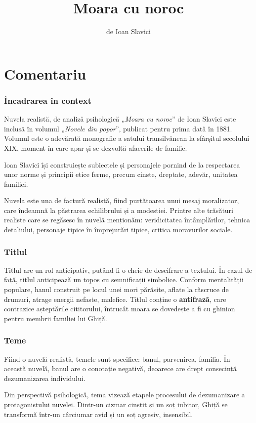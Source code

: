 \documentclass{article}
\title{Moara cu noroc}
\author{de Ioan Slavici}
\date{}
\newcommand{\qu}[1]{„\emph{#1}”}
\begin{document}
\maketitle

\part*{Comentariu}
\section{Încadrarea în context}
Nuvela realistă, de analiză psihologică \qu{Moara cu noroc} de Ioan Slavici este inclusă în volumul \qu{Novele din popor}, publicat pentru prima dată în 1881. Volumul este o adevărată monografie a satului transilvănean la sfârșitul secolului XIX, moment în care apar și se dezvoltă afacerile de familie.

Ioan Slavici își construiește subiectele și personajele pornind de la respectarea unor norme și principii etice ferme, precum cinste, dreptate, adevăr, unitatea familiei.

Nuvela este una de factură realistă, fiind purtătoarea unui mesaj moralizator, care îndeamnă la păstrarea echilibrului și a modestiei. Printre alte trăsături realiste care se regăsesc în nuvelă menționăm: veridicitatea întâmplărilor, tehnica detaliului, personaje tipice în împrejurări tipice, critica moravurilor sociale.
\section{Titlul}
Titlul are un rol anticipativ, putând fi o cheie de descifrare a textului. În cazul de față, titlul anticipează un topos cu semnificații simbolice. Conform mentalității populare, hanul construit pe locul unei mori părăsite, aflate la răscruce de drumuri, atrage energii nefaste, malefice. Titlul conține o \textbf{antifrază}, care contrazice așteptările cititorului, întrucât moara se dovedește a fi cu ghinion pentru membrii familiei lui Ghiță.

\section{Teme}
Fiind o nuvelă realistă, temele sunt specifice: banul, parvenirea, familia. În această nuvelă, banul are o conotație negativă, deoarece are drept consecință dezumanizarea individului.

Din perspectivă psihologică, tema vizează etapele procesului de dezumanizare a protagonistului nuvelei. Dintr-un cizmar cinstit și un soț iubitor, Ghiță se transformă într-un cârciumar avid și un soț agresiv, insensibil.
\end{document}
